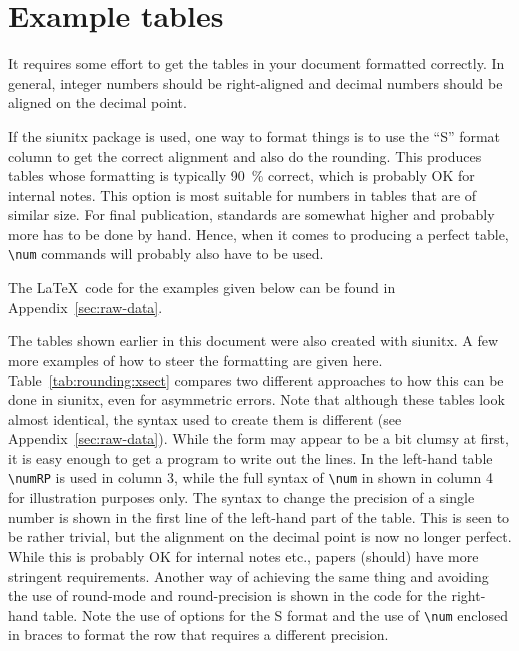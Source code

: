 \documentclass[UKenglish]{style/atlasdoc}
\newcommand*\Macro[1]{\texttt{\textbackslash#1}}
\begin{document}
\section{Example tables}
\label{sec:table}

It requires some effort to get the tables in your document formatted
correctly. In general, integer numbers should be right-aligned and
decimal numbers should be aligned on the decimal point.

If the \textsf{siunitx} package is used, one way to format things is
to use the \enquote{S} format column to get the correct alignment and
also do the rounding. This produces tables whose formatting is
typically \SI{90}{\percent} correct, which is probably OK for internal
notes. This option is most suitable for numbers in tables that are of
similar size. For final publication, standards are somewhat higher and probably
more has to be done by hand. Hence, when it comes to producing a perfect
table, \Macro{num} commands will probably also have to be used.

The \LaTeX\ code for the examples given below can be found in 
Appendix~\ref{sec:raw-data}.

The tables shown earlier in this document were also created with \textsf{siunitx}.
 A few more examples of how to steer the formatting are given here.
Table~\ref{tab:rounding:xsect} compares two different approaches
to how this can be done  in \textsf{siunitx}, even for asymmetric errors.  Note that although these
tables look almost identical, the syntax used to create them is different (see Appendix~\ref{sec:raw-data}).
While the form may appear to be a bit clumsy at first, it is easy enough to get a
program to write out the lines. In the left-hand table
\Macro{numRP} is used in column 3, while the full syntax of \Macro{num} 
in shown in column 4 for illustration purposes only.  The syntax
to change the precision of a single number is shown in the first line of
the left-hand part of the table. This is seen to be rather
trivial, but the alignment on the decimal point is now no longer
perfect. While this is probably OK for internal notes etc., papers
(should) have more stringent requirements. Another way of achieving
the same thing and avoiding the use of \textsf{round-mode} and
\textsf{round-precision} is shown in the code for the right-hand table. Note the
use of options for the \textsf{S} format and the use of \Macro{num} enclosed
in braces to format the row that requires a different precision.
\end{document}
